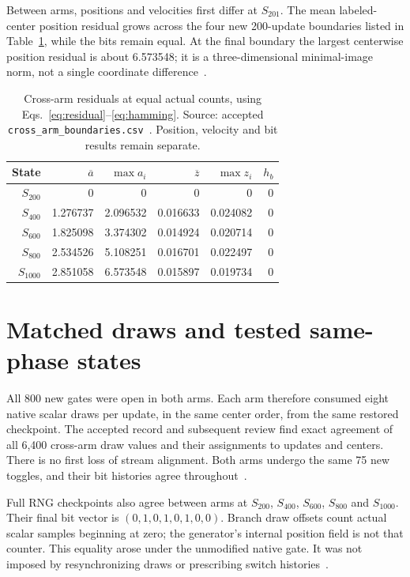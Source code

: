 \documentclass[11pt,a4paper]{article}
\begin{document}
Between arms, positions and velocities first differ at $S_{201}$. The mean labeled-center position residual grows across the four new 200-update boundaries listed in Table~\ref{tab:cross}, while the bits remain equal. At the final boundary the largest centerwise position residual is about 6.573548; it is a three-dimensional minimal-image norm, not a single coordinate difference~\cite{records,reviewdata}.

\begin{table}[htbp]
\centering\small
\begin{tabular}{rrrrrr}
\toprule State & $\overline a$ & $\max a_i$ & $\overline z$ & $\max z_i$ & $h_b$ \\
\midrule
$S_{200}$ & 0 & 0 & 0 & 0 & 0 \\
$S_{400}$ & 1.276737 & 2.096532 & 0.016633 & 0.024082 & 0 \\
$S_{600}$ & 1.825098 & 3.374302 & 0.014924 & 0.020714 & 0 \\
$S_{800}$ & 2.534526 & 5.108251 & 0.016701 & 0.022497 & 0 \\
$S_{1000}$ & 2.851058 & 6.573548 & 0.015897 & 0.019734 & 0 \\
\bottomrule
\end{tabular}
\caption{Cross-arm residuals at equal actual counts, using Eqs.~\eqref{eq:residual}--\eqref{eq:hamming}. Source: accepted \texttt{cross\_arm\_boundaries.csv}~\cite{records}. Position, velocity and bit results remain separate.}
\label{tab:cross}
\end{table}

\section{Matched draws and tested same-phase states}
\label{sec:randomness}
All 800 new gates were open in both arms. Each arm therefore consumed eight native scalar draws per update, in the same center order, from the same restored checkpoint. The accepted record and subsequent review find exact agreement of all 6,400 cross-arm draw values and their assignments to updates and centers. There is no first loss of stream alignment. Both arms undergo the same 75 new toggles, and their bit histories agree throughout~\cite{sim02,reviewdata}.

Full RNG checkpoints also agree between arms at $S_{200}$, $S_{400}$, $S_{600}$, $S_{800}$ and $S_{1000}$. Their final bit vector is $(0,1,0,1,0,1,0,0)$. Branch draw offsets count actual scalar samples beginning at zero; the generator's internal position field is not that counter. This equality arose under the unmodified native gate. It was not imposed by resynchronizing draws or prescribing switch histories~\cite{sim02,review}.
\end{document}
